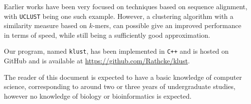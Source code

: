 Earlier works have been very focused on techniques based on sequence alignment,
with \texttt{UCLUST} being one such example. However, a clustering algorithm
with a similarity measure based on $k$-mers, can possible give an improved
performance in terms of speed, while still being a sufficiently good approximation.

Our program, named \texttt{klust}, has been implemented in \texttt{C++} and is
hosted on GitHub and is available at \url{https://github.com/Rathcke/klust}.

The reader of this document is expected to have a basic knowledge of computer
science, corresponding to around two or three years of undergraduate studies,
however no knowledge of biology or bioinformatics is expected.
